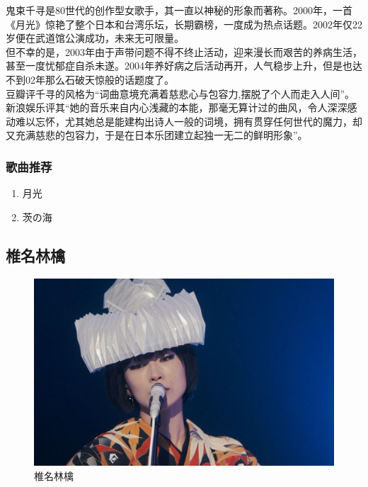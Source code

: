 \documentclass{ctexart}
\begin{document}
\begin{figure}[h]
{\begin{minipage}[t]{0.5\linewidth}
\end{minipage}
}
\end{figure}

鬼束千寻是80世代的创作型女歌手，其一直以神秘的形象而著称。2000年，一首《月光》惊艳了整个日本和台湾乐坛，长期霸榜，一度成为热点话题。2002年仅22岁便在武道馆公演成功，未来无可限量。\\
但不幸的是，2003年由于声带问题不得不终止活动，迎来漫长而艰苦的养病生活，甚至一度忧郁症自杀未遂。2004年养好病之后活动再开，人气稳步上升，但是也达不到02年那么石破天惊般的话题度了。\\
豆瓣评千寻的风格为“词曲意境充满着慈悲心与包容力,摆脱了个人而走入人间”。新浪娱乐评其“她的音乐来自内心浅藏的本能，那毫无算计过的曲风，令人深深感动难以忘怀，尤其她总是能建构出诗人一般的词境，拥有贯穿任何世代的魔力，却又充满慈悲的包容力，于是在日本乐团建立起独一无二的鲜明形象”。
\subsubsection*{歌曲推荐}
\begin{enumerate}
\item 月光
\item 茨の海
\end{enumerate}


\subsection{椎名林檎}

\begin{figure}[h]
\centering
 \includegraphics[width=1.0\textwidth]{ringo}
 \caption{椎名林檎}
\end{figure}
\end{document}
